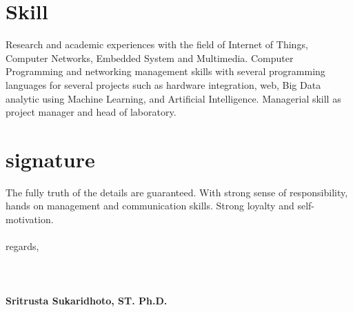 \documentclass[]{friggeri-cv} %
\begin{document}

\section{Skill}

Research and academic experiences with the field of Internet of Things, Computer Networks, Embedded System and Multimedia. Computer Programming and networking management skills with several programming languages for several projects such as hardware integration, web, Big Data analytic using Machine Learning, and Artificial Intelligence. Managerial skill as project manager and head of laboratory. 


\section{signature}

The fully truth of the details are guaranteed. 
With strong sense of responsibility, hands on management and communication skills. 
Strong loyalty and self-motivation. 
\\
\\ 
regards, 
\\ 
\\
\\
\\
\textbf{Sritrusta Sukaridhoto, ST. Ph.D.} 
\end{document}
